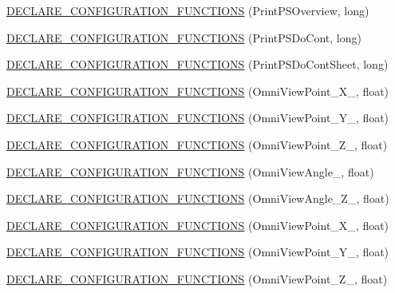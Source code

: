 \begin{DoxyCompactItemize}
\item 
\hyperlink{a00191_a7afb48a074d9a8591813a9016efeff71}{D\-E\-C\-L\-A\-R\-E\-\_\-\-C\-O\-N\-F\-I\-G\-U\-R\-A\-T\-I\-O\-N\-\_\-\-F\-U\-N\-C\-T\-I\-O\-N\-S} (Print\-P\-S\-Overview, long)
\item 
\hyperlink{a00191_a882279cbf0ff6b9942b46164f5fd5a8f}{D\-E\-C\-L\-A\-R\-E\-\_\-\-C\-O\-N\-F\-I\-G\-U\-R\-A\-T\-I\-O\-N\-\_\-\-F\-U\-N\-C\-T\-I\-O\-N\-S} (Print\-P\-S\-Do\-Cont, long)
\item 
\hyperlink{a00191_ad13cea1f5e45a7e3be7bb812d43b250d}{D\-E\-C\-L\-A\-R\-E\-\_\-\-C\-O\-N\-F\-I\-G\-U\-R\-A\-T\-I\-O\-N\-\_\-\-F\-U\-N\-C\-T\-I\-O\-N\-S} (Print\-P\-S\-Do\-Cont\-Sheet, long)
\item 
\hyperlink{a00191_ae8a12dded11502818d3694ad666d83f9}{D\-E\-C\-L\-A\-R\-E\-\_\-\-C\-O\-N\-F\-I\-G\-U\-R\-A\-T\-I\-O\-N\-\_\-\-F\-U\-N\-C\-T\-I\-O\-N\-S} (Omni\-View\-Point\-\_\-\-X\-\_, float)
\item 
\hyperlink{a00191_a15d1d86d05532eff7ad9e1553be7bf07}{D\-E\-C\-L\-A\-R\-E\-\_\-\-C\-O\-N\-F\-I\-G\-U\-R\-A\-T\-I\-O\-N\-\_\-\-F\-U\-N\-C\-T\-I\-O\-N\-S} (Omni\-View\-Point\-\_\-\-Y\-\_, float)
\item 
\hyperlink{a00191_abb96cb385fa1859bebb0f2d650289444}{D\-E\-C\-L\-A\-R\-E\-\_\-\-C\-O\-N\-F\-I\-G\-U\-R\-A\-T\-I\-O\-N\-\_\-\-F\-U\-N\-C\-T\-I\-O\-N\-S} (Omni\-View\-Point\-\_\-\-Z\-\_, float)
\item 
\hyperlink{a00191_a94989a8607cae35feea7583827e287f7}{D\-E\-C\-L\-A\-R\-E\-\_\-\-C\-O\-N\-F\-I\-G\-U\-R\-A\-T\-I\-O\-N\-\_\-\-F\-U\-N\-C\-T\-I\-O\-N\-S} (Omni\-View\-Angle\-\_, float)
\item 
\hyperlink{a00191_abb47a32af790ebaa2e639a6ac4f48afa}{D\-E\-C\-L\-A\-R\-E\-\_\-\-C\-O\-N\-F\-I\-G\-U\-R\-A\-T\-I\-O\-N\-\_\-\-F\-U\-N\-C\-T\-I\-O\-N\-S} (Omni\-View\-Angle\-\_\-\-Z\-\_, float)
\item 
\hyperlink{a00191_a84fa8d1ab5263b5be4b82a29a34c0645}{D\-E\-C\-L\-A\-R\-E\-\_\-\-C\-O\-N\-F\-I\-G\-U\-R\-A\-T\-I\-O\-N\-\_\-\-F\-U\-N\-C\-T\-I\-O\-N\-S} (Omni\-View\-Point\-\_\-\-X\-\_, float)
\item 
\hyperlink{a00191_ac6bf68f16106b18081e407777b7aac02}{D\-E\-C\-L\-A\-R\-E\-\_\-\-C\-O\-N\-F\-I\-G\-U\-R\-A\-T\-I\-O\-N\-\_\-\-F\-U\-N\-C\-T\-I\-O\-N\-S} (Omni\-View\-Point\-\_\-\-Y\-\_, float)
\item 
\hyperlink{a00191_a93e154ec5f4bc2e70a25c28f61ed4fb0}{D\-E\-C\-L\-A\-R\-E\-\_\-\-C\-O\-N\-F\-I\-G\-U\-R\-A\-T\-I\-O\-N\-\_\-\-F\-U\-N\-C\-T\-I\-O\-N\-S} (Omni\-View\-Point\-\_\-\-Z\-\_, float)

\end{DoxyCompactItemize}
